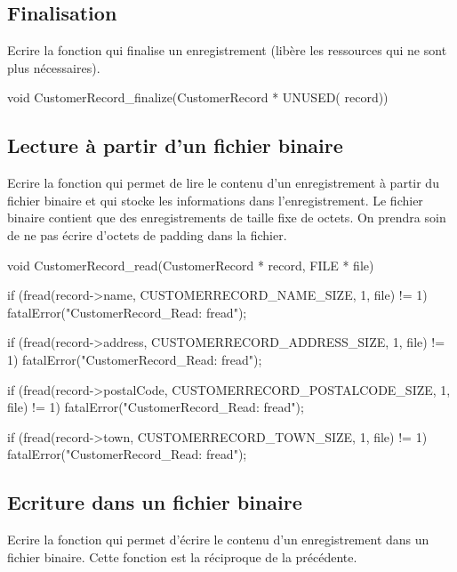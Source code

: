 \subsection{Finalisation}

Ecrire la fonction  qui finalise un enregistrement (libère les ressources qui ne sont plus nécessaires).

\begin{csourcecorrection}
void CustomerRecord_finalize(CustomerRecord * UNUSED( record)) {
}
\end{csourcecorrection}

\subsection{Lecture à partir d'un fichier binaire}

Ecrire la fonction  qui permet de lire le contenu d'un enregistrement à partir du fichier binaire et qui stocke les informations dans l'enregistrement. Le fichier binaire contient que des enregistrements de taille fixe de  octets. On prendra soin de ne pas écrire d'octets de padding dans la fichier.

\begin{csourcecorrection}
void CustomerRecord_read(CustomerRecord * record, FILE * file) {
    if (fread(record->name, CUSTOMERRECORD_NAME_SIZE, 1, file) != 1)
        fatalError("CustomerRecord_Read: fread");

    if (fread(record->address, CUSTOMERRECORD_ADDRESS_SIZE, 1, file) != 1)
        fatalError("CustomerRecord_Read: fread");

    if (fread(record->postalCode, CUSTOMERRECORD_POSTALCODE_SIZE, 1, file) != 1)
        fatalError("CustomerRecord_Read: fread");

    if (fread(record->town, CUSTOMERRECORD_TOWN_SIZE, 1, file) != 1)
        fatalError("CustomerRecord_Read: fread");
}
\end{csourcecorrection}

\subsection{Ecriture dans un fichier binaire}

Ecrire la fonction  qui permet d'écrire le contenu d'un enregistrement dans un fichier binaire. Cette fonction est la réciproque de la précédente.

